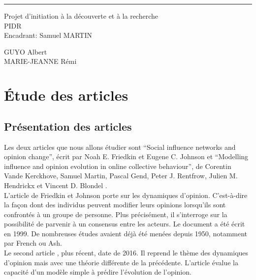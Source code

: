 \documentclass{scrreprt}
\date{}
\begin{document}
\begin{flushright}
    \rule{16cm}{5pt}\vskip1cm
    \begin{bfseries}
        \Huge{Projet d'initiation à la découverte et à la recherche \\ PIDR}\\
        \vspace{1.9cm}
        \LARGE{Encadrant: Samuel MARTIN}\\
       \vspace{10.9cm}
	\begin{center}
		GUYO Albert\\
		MARIE-JEANNE Rémi\\
	\end{center}
        \vspace{1.9cm}
    \end{bfseries}
\end{flushright}

\tableofcontents


\chapter{Étude des articles}

\section{Présentation des articles}

Les deux articles que nous allons étudier sont “Social influence networks and opinion change”, écrit par Noah E. Friedkin et Eugene C. Johnson \cite{FJ} et “Modelling influence and opinion evolution in online collective behaviour”, de Corentin Vande Kerckhove, Samuel Martin, Pascal Gend, Peter J. Rentfrow, Julien M. Hendrickx et Vincent D. Blondel \cite{VMG}.\\

L’article \cite{FJ} de Friedkin et Johnson porte sur les dynamiques d’opinion. C’est-à-dire la façon dont des individus peuvent modifier leurs opinions lorsqu’ils sont confrontés à un groupe de personne. Plus précisément, il s’interroge sur la possibilité de parvenir à un consensus entre les acteurs. Le document a été écrit en 1999. De nombreuses études avaient déjà été menées depuis 1950, notamment par French ou Ash.\\

Le second article \cite{VMG}, plus récent, date de 2016. Il reprend le thème des dynamiques d’opinion mais avec une théorie différente de la précédente. L'article évalue la capacité d'un modèle simple à prédire l'évolution de l'opinion.
\end{document}

